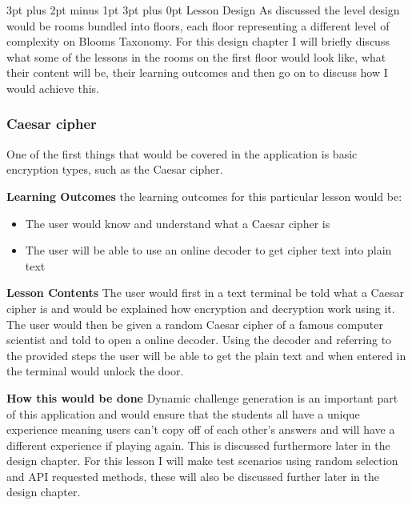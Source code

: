 \documentclass[12pt,a4paper]{article}
\makeatletter
\renewcommand\subsection{\@startsection {subsection}{1}{2mm} %
                               {3pt plus 2pt minus 1pt} %
                               {3pt plus 0pt} %
                               {\normalfont\bfseries}}
\makeatother
\begin{document}
\subsection{Lesson Design}  
As discussed the level design would be rooms bundled into floors, each floor representing a different level of complexity on Blooms Taxonomy. For this design chapter I will briefly discuss what some of the lessons in the rooms on the first floor would look like, what their content will be, their learning outcomes and then go on to discuss how I would achieve this. 
\subsubsection{Caesar cipher} 
One of the first things that would be covered in the application is basic encryption types, such as the Caesar cipher.  

\textbf{Learning Outcomes} 
\newline the learning outcomes for this particular lesson would be:  

\begin{itemize}\itemsep0pt
	\item The user would know and understand what a Caesar cipher is 
	\item The user will be able to use an online decoder to get cipher text into plain text
\end{itemize} 

\textbf{Lesson Contents} 
\newline The user would first in a text terminal be told what a Caesar cipher is and would be explained how encryption and decryption work using it. The user would then be given a random Caesar cipher of a famous computer scientist and told to open a online decoder. Using the decoder and referring to the provided steps the user will be able to get the plain text and when entered in the terminal would unlock the door.

\textbf{How this would be done} 
\newline Dynamic challenge generation is an important part of this application and would ensure that the students all have a unique experience meaning users can't copy off of each other's answers and will have a different experience if playing again. This is discussed furthermore later in the design chapter. For this lesson I will make test scenarios using random selection and API requested methods, these will also be discussed further later in the design chapter. 
\end{document}
